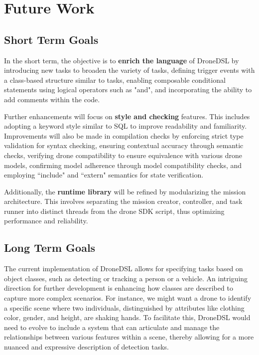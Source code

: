 \chapter{Future Work}
\label{sec:future}


\section{Short Term Goals}
In the short term, the objective is to \textbf{enrich the language} of DroneDSL by introducing new tasks to broaden the variety of tasks, defining trigger events with a class-based structure similar to tasks, enabling composable conditional statements using logical operators such as "and", and incorporating the ability to add comments within the code.

Further enhancements will focus on \textbf{style and checking} features. This includes adopting a keyword style similar to SQL to improve readability and familiarity. Improvements will also be made in compilation checks by enforcing strict type validation for syntax checking, ensuring contextual accuracy through semantic checks, verifying drone compatibility to ensure equivalence with various drone models, confirming model adherence through model compatibility checks, and employing ``include" and ``extern" semantics for state verification.

Additionally, the \textbf{runtime library} will be refined by modularizing the mission architecture. This involves separating the mission creator, controller, and task runner into distinct threads from the drone SDK script, thus optimizing performance and reliability.

\section{Long Term Goals}
The current implementation of DroneDSL allows for specifying tasks based on object classes, such as detecting or tracking a person or a vehicle. An intriguing direction for further development is enhancing how classes are described to capture more complex scenarios. For instance, we might want a drone to identify a specific scene where two individuals, distinguished by attributes like clothing color, gender, and height, are shaking hands. To facilitate this, DroneDSL would need to evolve to include a system that can articulate and manage the relationships between various features within a scene, thereby allowing for a more nuanced and expressive description of detection tasks.

